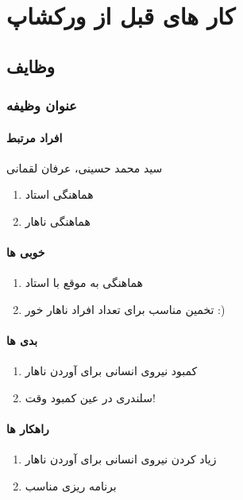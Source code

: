 \chapter{کار های قبل از ورکشاپ}

\section{وظایف}

\subsection{عنوان وظیفه}
\subsubsection{افراد مرتبط}
سید محمد حسینی، عرفان لقمانی
\begin{enumerate}
	\item هماهنگی استاد
	\item هماهنگی ناهار
\end{enumerate}

\subsubsection{خوبی ها}
\begin{enumerate}
	\item هماهنگی به موقع با استاد
	\item تخمین مناسب برای تعداد افراد ناهار خور :)
\end{enumerate}

\subsubsection{بدی ها}
\begin{enumerate}
	\item کمبود نیروی انسانی برای  آوردن ناهار
	\item  سلندری در عین کمبود وقت!
\end{enumerate}

\subsubsection{راهکار ها}
\begin{enumerate}
	\item زیاد کردن نیروی انسانی برای آوردن ناهار
	\item برنامه ریزی مناسب
\end{enumerate}